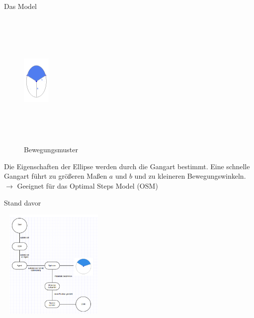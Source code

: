 \begin{frame}{Das Model}
		\begin{minipage}{0.5\textwidth}
			\begin{figure}[H]
				\includegraphics[width=50px, height=250px, keepaspectratio]{appendix/images/ellipse.png}		
				\caption{\label{fig:blue_rectangle} Bewegungsmuster}
			\end{figure}
		\end{minipage} \hfill
		\begin{minipage}{0.45\textwidth}
			Die Eigenschaften der Ellipse werden durch die Gangart bestimmt. 
			Eine schnelle Gangart führt zu größeren Maßen $a$ und $b$ und zu kleineren Bewegungswinkeln. \newline \newline
			$\rightarrow$ Geeignet für das Optimal Steps Model (OSM) \newline

		\end{minipage}	
\end{frame}

\begin{frame}{Stand davor}
	\begin{center}
		\includegraphics[width=200px, height=200px, keepaspectratio]{appendix/images/struct.png}		
	\end{center}
\end{frame}

